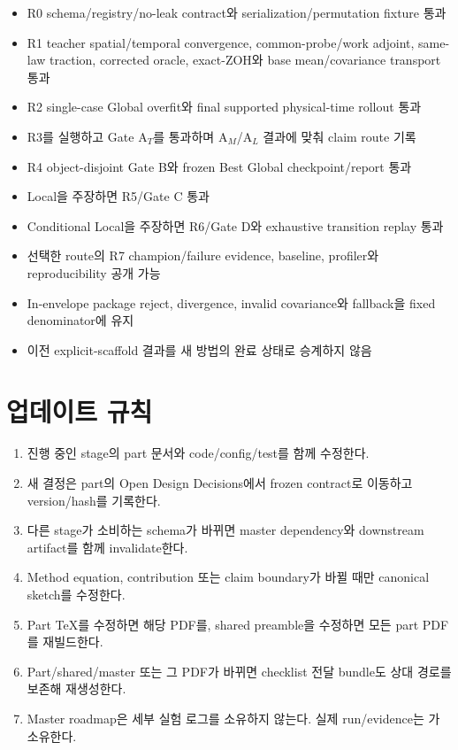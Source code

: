 \documentclass[10pt]{article}
\begin{document}
\begin{itemize}
  \item[$\square$] R0 schema/registry/no-leak contract와 serialization/permutation fixture 통과
  \item[$\square$] R1 teacher spatial/temporal convergence, common-probe/work adjoint,
  same-law traction, corrected oracle, exact-ZOH와 base mean/covariance transport 통과
  \item[$\square$] R2 single-case Global overfit와 final supported physical-time rollout 통과
  \item[$\square$] R3를 실행하고 Gate A\(_T\)를 통과하며 A\(_M\)/A\(_L\) 결과에 맞춰 claim route 기록
  \item[$\square$] R4 object-disjoint Gate B와 frozen Best Global checkpoint/report 통과
  \item[$\square$] Local을 주장하면 R5/Gate C 통과
  \item[$\square$] Conditional Local을 주장하면 R6/Gate D와 exhaustive transition replay 통과
  \item[$\square$] 선택한 route의 R7 champion/failure evidence, baseline, profiler와 reproducibility 공개 가능
  \item[$\square$] In-envelope package reject, divergence, invalid covariance와 fallback을 fixed denominator에 유지
  \item[$\square$] 이전 explicit-scaffold 결과를 새 방법의 완료 상태로 승계하지 않음
\end{itemize}

\section{업데이트 규칙}

\begin{enumerate}
  \item 진행 중인 stage의 part 문서와 code/config/test를 함께 수정한다.
  \item 새 결정은 part의 Open Design Decisions에서 frozen contract로 이동하고 version/hash를 기록한다.
  \item 다른 stage가 소비하는 schema가 바뀌면 master dependency와 downstream artifact를 함께 invalidate한다.
  \item Method equation, contribution 또는 claim boundary가 바뀔 때만 canonical sketch를 수정한다.
  \item Part TeX를 수정하면 해당 PDF를, shared preamble을 수정하면 모든 part PDF를 재빌드한다.
  \item Part/shared/master 또는 그 PDF가 바뀌면 checklist 전달 bundle도 상대 경로를 보존해 재생성한다.
  \item Master roadmap은 세부 실험 로그를 소유하지 않는다. 실제 run/evidence는 가 소유한다.
\end{enumerate}
\end{document}
